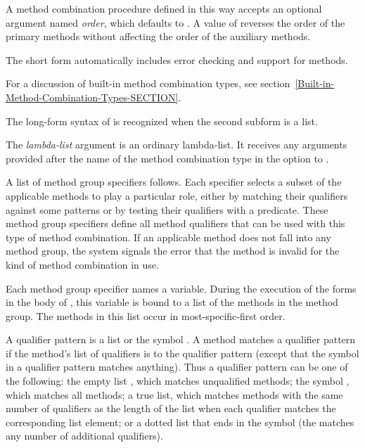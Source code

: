 \begin{defmac}
A method combination procedure defined in this way accepts an optional
argument named \emph{order}, which defaults to 
.  A value of  reverses
the order of the primary methods without affecting the order of the
auxiliary methods.

The short form automatically includes error checking and support for
 methods.

For a discussion of built-in method combination types,
see section~\ref{Built-in-Method-Combination-Types-SECTION}.

\medskip

The long-form syntax of  is recognized 
when the second subform is a list.  

The \emph{lambda-list\/} argument is an ordinary lambda-list.  It
receives any arguments provided after the name of the method
combination type in the  option to 
.

A list of method group specifiers follows.  Each specifier selects a subset
of the applicable methods to play a particular role, either by matching
their qualifiers against some patterns or by testing their qualifiers with
a predicate.   These method group specifiers define all method qualifiers
that can be used with this type of method combination.  If an applicable 
method does not fall into any method group, the system signals the error
that the method is invalid for the kind of method combination in use.

Each method group specifier names a variable.  During the execution of
the forms in the body of , this
variable is bound to a list of the methods in the method group.  The
methods in this list occur in most-specific-first order.

A qualifier pattern is a list or the symbol \cdf{*}.  A method matches
a qualifier pattern if the method's list of qualifiers is 
to the qualifier pattern (except that the symbol \cdf{*} in a qualifier
pattern matches anything).  Thus a qualifier pattern can be one of the
following: the empty list \cd{()}, which matches unqualified methods;
the symbol \cdf{*}, which matches all methods; a true list, which
matches methods with the same number of qualifiers as the length of
the list when each qualifier matches the corresponding list element;
or a dotted list that ends in the symbol \cdf{*} (the \cdf{*} matches
any number of additional qualifiers).



\end{defmac}
